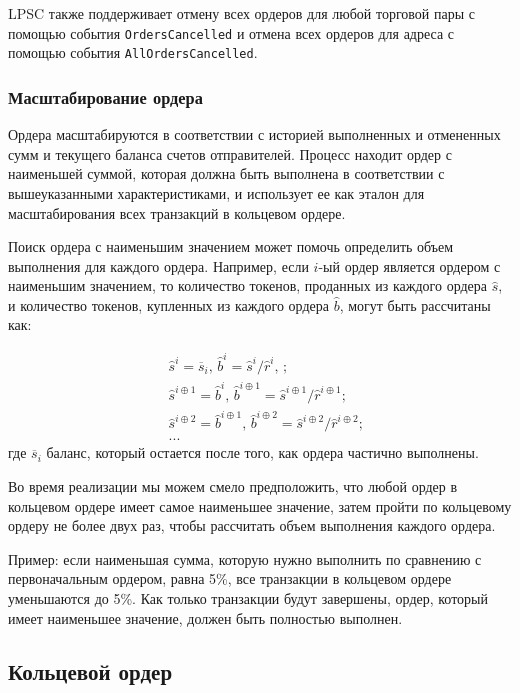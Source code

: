 \documentclass[utf8,nofonts]{article}
\begin{document}
\begin{multicols}{2}
	LPSC также поддерживает отмену всех ордеров для любой торговой пары с помощью события \verb|OrdersCancelled| и отмена всех ордеров для адреса с помощью события \verb|AllOrdersCancelled|.
	
	
	\subsubsection{Масштабирование ордера\label{sec:order_scaling}}
	Ордера масштабируются в соответствии с историей выполненных и отмененных сумм и текущего баланса счетов отправителей. Процесс находит ордер с наименьшей суммой, которая должна быть выполнена в соответствии с вышеуказанными характеристиками, и использует ее как эталон для масштабирования всех транзакций в кольцевом ордере.
	
	
	Поиск ордера с наименьшим значением может помочь определить объем выполнения для каждого ордера. Например, если $ i $-ый ордер является ордером с наименьшим значением, то количество токенов, проданных из каждого ордера $ \hat {s} $, и количество токенов, купленных из каждого ордера $ \hat {b} $, могут быть рассчитаны как:
	
	\[
	\begin{split}
	&\hat{s}^{i}=\overline{s}_i\text{, } \hat{b}^{i}=\hat{s}^{i}/ \hat{r}^i\text{, }\text{;}\\
	&\hat{s}^{i\oplus 1}=\hat{b}^i\text{, } \hat{b}^{i\oplus 1}=\hat{s}^{i\oplus 1}/ \hat{r}^{i\oplus 1}\text{;}\\
	&\hat{s}^{i\oplus 2}=\hat{b}^{i\oplus 1}\text{, } \hat{b}^{i\oplus 2}=\hat{s}^{i\oplus 2}/ \hat{r}^{i\oplus 2}\text{;}\\
	& ...
	\end{split}
	\]
	где $\overline{s}_i$ баланс, который остается после того, как ордера частично выполнены.
	
	Во время реализации мы можем смело предположить, что любой ордер в кольцевом ордере имеет самое наименьшее значение, затем пройти по кольцевому ордеру не более двух раз, чтобы рассчитать объем выполнения каждого ордера. 
	
	Пример: если наименьшая сумма, которую нужно выполнить по сравнению с первоначальным ордером, равна 5\%, все транзакции в кольцевом ордере уменьшаются до 5\%. Как только транзакции будут завершены, ордер, который имеет наименьшее значение, должен быть полностью выполнен.
	
	\subsection{Кольцевой ордер\label{sec:settlement}}
	

\end{multicols}
\end{document}
